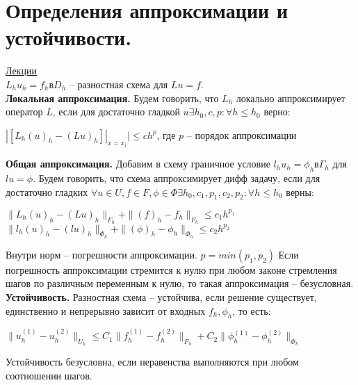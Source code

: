 \documentclass[specialist, subf, href, colorlinks=true, 12pt, times, mtpro, final]{disser}
\theoremstyle{definition}
\begin{document}
{\section {Определения аппроксимации и устойчивости.}
    \hyperlink {lects.118}{Лекции}\\
    $L_hu_h = f_h в D_h$ -- разностная схема для $Lu = f$.\\
    \textbf{Локальная аппроксимация.} Будем говорить, что $L_h$ локально аппроксимирует оператор $L$, если для достаточно гладкой $u \exists h_0, c, p: \forall h \leq h_0$ 		верно:
    \begin{center}
    	$| [ L_h(u)_h - (Lu)_h ]|_{x=x_i}| \leq ch^p$, где $p$ -- порядок аппроксимации
    \end{center}
    \textbf{Общая аппроксимация.} Добавим в схему граничное условие $l_hu_h = \phi_h в \Gamma_h$ для $lu=\phi$. Будем говорить, что схема аппроксимирует дифф задачу, 		если для достаточно гладких $\forall u\in U, f\in F, \phi \in \Phi \exists h_0, c_1, p_1, c_2, p_2: \forall h \leq h_0$ верны:
    \begin{center}
    	$\|L_h(u)_h - (Lu)_h\|_{F_h} + \| (f)_h - f_h\|_{F_h}\leq c_1h^{p_1}$\\
    	$\|l_h(u)_h - (lu)_h\|_{\Phi_h} + \| (\phi)_h - \phi_h\|_{\Phi_h}\leq c_2h^{p_2}$
    \end{center}
    Внутри норм -- погрешности аппроксимации. $p = min(p_1, p_2)$
    Если погрешность аппроксимации стремится к нулю при любом законе стремления шагов по различным переменным к нулю, то такая аппроксимация -- безусловная.
    \textbf{Устойчивость.} Разностная схема -- устойчива, если решение существует, единственно и непрерывно зависит от входных $f_h, \phi_h$, то есть:
    \begin{center}
    	$\|u_h^{(1)} - u_h^{(2)}\|_{U_h} \leq C_1\| f_h^{(1)} - f_h^{(2)}\|_{F_h} + C_2\| \phi_h^{(1)} - \phi_h^{(2)}\|_{\Phi_h}$\\
    \end{center}
    Устойчивость безусловна, если неравенства выполняются при любом соотношении шагов.

}
\end{document}
